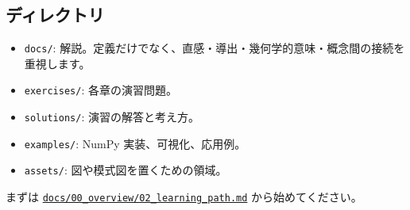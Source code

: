 \documentclass[
  11pt,
  a4paper,
]{ltjsarticle}
\providecommand{\tightlist}{%
  \setlength{\itemsep}{0pt}\setlength{\parskip}{0pt}}
\begin{document}
\hypertarget{ux30c7ux30a3ux30ecux30afux30c8ux30ea}{%
\subsection{ディレクトリ}\label{ux30c7ux30a3ux30ecux30afux30c8ux30ea}}

\begin{itemize}
\tightlist
\item
  \texttt{docs/}:
  解説。定義だけでなく、直感・導出・幾何学的意味・概念間の接続を重視します。
\item
  \texttt{exercises/}: 各章の演習問題。
\item
  \texttt{solutions/}: 演習の解答と考え方。
\item
  \texttt{examples/}: NumPy 実装、可視化、応用例。
\item
  \texttt{assets/}: 図や模式図を置くための領域。
\end{itemize}

まずは
\href{docs/00_overview/02_learning_path.pdf}{\texttt{docs/00\_overview/02\_learning\_path.md}}
から始めてください。
\end{document}
